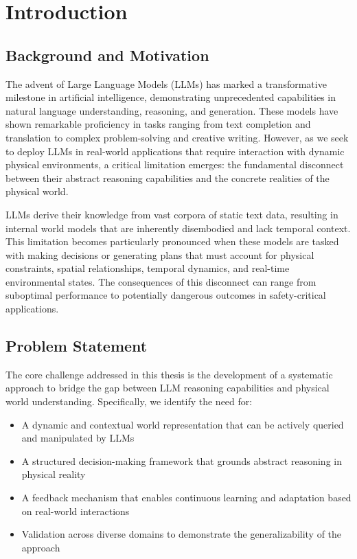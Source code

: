 
\chapter{Introduction} \label{chp:intro}

\section{Background and Motivation}

The advent of Large Language Models (LLMs) has marked a transformative milestone in artificial intelligence, demonstrating unprecedented capabilities in natural language understanding, reasoning, and generation. These models have shown remarkable proficiency in tasks ranging from text completion and translation to complex problem-solving and creative writing. However, as we seek to deploy LLMs in real-world applications that require interaction with dynamic physical environments, a critical limitation emerges: the fundamental disconnect between their abstract reasoning capabilities and the concrete realities of the physical world.

LLMs derive their knowledge from vast corpora of static text data, resulting in internal world models that are inherently disembodied and lack temporal context. This limitation becomes particularly pronounced when these models are tasked with making decisions or generating plans that must account for physical constraints, spatial relationships, temporal dynamics, and real-time environmental states. The consequences of this disconnect can range from suboptimal performance to potentially dangerous outcomes in safety-critical applications.

\section{Problem Statement}

The core challenge addressed in this thesis is the development of a systematic approach to bridge the gap between LLM reasoning capabilities and physical world understanding. Specifically, we identify the need for:

\begin{itemize}
    \item A dynamic and contextual world representation that can be actively queried and manipulated by LLMs
    \item A structured decision-making framework that grounds abstract reasoning in physical reality
    \item A feedback mechanism that enables continuous learning and adaptation based on real-world interactions
    \item Validation across diverse domains to demonstrate the generalizability of the approach
\end{itemize}

